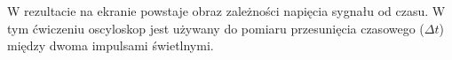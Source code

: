 \documentclass[a4paper,12pt]{article}
\begin{document}
W rezultacie na ekranie powstaje obraz zależności napięcia sygnału od czasu. W tym ćwiczeniu oscyloskop jest używany do pomiaru przesunięcia czasowego ($\Delta t$) między dwoma impulsami świetlnymi.











\end{document}
